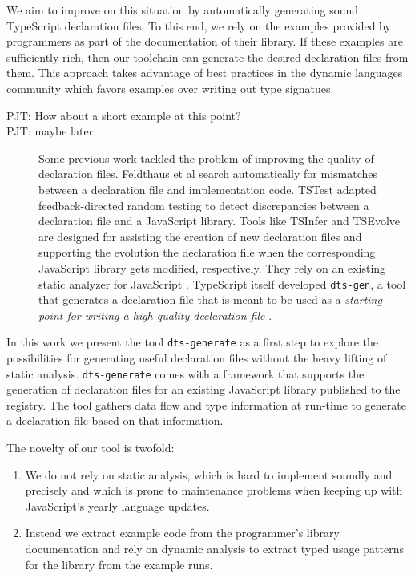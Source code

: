 \documentclass[english,cleveref,autoref,submission]{programming}
\begin{document}
We aim to improve on this situation by automatically generating
sound TypeScript declaration files. To this end, we rely on the examples provided
by programmers as part of the documentation of their library. If these
examples are sufficiently rich, then our toolchain can generate the
desired declaration files from them. This approach takes advantage of
best practices in the dynamic languages community which favors
examples over writing out type signatues.


\begin{description}
\item[PJT: How about a short example at this point?] 
\item[PJT: maybe later] Some previous work tackled the problem of improving
  the quality of declaration files. Feldthaus et al
  \cite{DBLP:conf/oopsla/FeldthausM14} search automatically for
  mismatches between a declaration file and implementation
  code. TSTest \cite{DBLP:journals/pacmpl/KristensenM17} adapted
  feedback-directed random testing to detect discrepancies between a
  declaration file and a JavaScript library. Tools like TSInfer and
  TSEvolve~\cite{DBLP:conf/fase/KristensenM17} are designed for
  assisting the creation of new declaration files and supporting the
  evolution the declaration file when the corresponding JavaScript
  library gets modified, respectively. They rely on an existing static
  analyzer for JavaScript \cite{DBLP:conf/sas/JensenMT09}.  TypeScript
  itself developed \texttt{dts-gen}, a tool that generates a
  declaration file that is meant to be used as a \emph{starting point
    for writing a high-quality declaration file} \cite{dts-gen}.
\end{description}
In this work we present the tool \texttt{dts-generate}
as a first step to explore the possibilities for
generating useful declaration files without the heavy lifting of
static analysis. \texttt{dts-generate} comes with a framework that
supports the generation of declaration files for an existing
JavaScript library published to the \NPM{} registry. The tool gathers
data flow and type information at run-time to generate a declaration
file based on that information.

The novelty of our tool is twofold:
\begin{enumerate}
\item 
  We do not rely on static analysis, which is hard to implement
  soundly and precisely and which is prone to maintenance problems
  when keeping up with JavaScript's yearly language updates.
\item
  Instead we extract example code from the programmer's library
  documentation and rely on dynamic analysis to extract typed usage
  patterns for the library from the example runs.
\end{enumerate}
\end{document}
